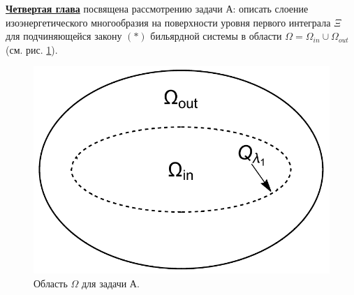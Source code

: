 \underline{\textbf{Четвертая глава}} посвящена рассмотрению задачи А: описать слоение изоэнергетического многообразия на поверхности уровня первого интеграла $\Xi$ для подчиняющейся закону $(\ast)$ бильярдной системы в области $\Omega = \Omega_{in} \cup \Omega_{out}$ (см. рис. \ref{fig:intro_problemA}).
\begin{figure}[!htb]
\centering
\includegraphics[scale=0.3]{images/ch4/section2/domain_problemA.pdf}
    \caption{Область $\Omega$ для задачи А.}
    \label{fig:intro_problemA}
\end{figure}

